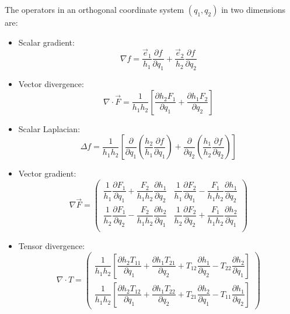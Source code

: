 \documentclass{article}
\numberwithin{equation}{section}
\newcommand{\pd}[2]{\dfrac{\partial #1}{\partial #2}}
\newcommand{\unitvec}[1]{\vec{e}_{#1}}
\begin{document}
The operators in an orthogonal coordinate system $(q_1, q_2)$ in two dimensions are:
\begin{itemize}
    \item Scalar gradient:
    \begin{equation}
        \nabla f
        = \frac{\unitvec{1}}{h_1} \pd{f}{q_1}
        + \frac{\unitvec{2}}{h_2} \pd{f}{q_2}
    \end{equation}
    \item Vector divergence:
    \begin{equation}
        \nabla \cdot \vec{F} =
        \frac{1}{h_1 h_2} \left[
              \pd{h_2 F_1}{q_1}
            + \pd{h_1 F_2}{q_2}
        \right]
    \end{equation}
    \item Scalar Laplacian:
    \begin{equation}
        \Delta f = 
        \frac{1}{h_1 h_2} \left[
            \pd{}{q_1} \left(\frac{h_2}{h_1} \pd{f}{q_1}\right)
            + \pd{}{q_2} \left(\frac{h_1}{h_2} \pd{f}{q_2}\right)
        \right]
    \end{equation}
    \item Vector gradient:
    \begin{equation}
        \nabla \vec{F} = \left(\begin{matrix}
            \dfrac{1}{h_1} \pd{F_1}{q_1} + \dfrac{F_2}{h_1 h_2} \pd{h_1}{q_2} &
            \dfrac{1}{h_1} \pd{F_2}{q_1} - \dfrac{F_1}{h_1 h_2} \pd{h_1}{q_2} \\
            \dfrac{1}{h_2} \pd{F_1}{q_2} - \dfrac{F_2}{h_1 h_2} \pd{h_2}{q_1} &
            \dfrac{1}{h_2} \pd{F_2}{q_2} + \dfrac{F_1}{h_1 h_2} \pd{h_2}{q_1} \\
        \end{matrix}\right)
    \end{equation}
    \item Tensor divergence:
    \begin{equation}
        \nabla \cdot T = \left(\begin{matrix}
            \dfrac{1}{h_1 h_2} \left[
                \pd{h_2 T_{11}}{q_1}
                + \pd{h_1 T_{21}}{q_2}
                + T_{12} \pd{h_1}{q_2}
                - T_{22} \pd{h_2}{q_1}
            \right] \\
            \dfrac{1}{h_1 h_2} \left[
                \pd{h_2 T_{12}}{q_1}
                + \pd{h_1 T_{22}}{q_2}
                + T_{21} \pd{h_2}{q_1}
                - T_{11} \pd{h_1}{q_2}
            \right]
        \end{matrix}\right)
    \end{equation}
\end{itemize}
\end{document}
